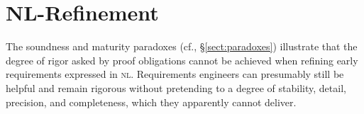 \documentclass[10pt, conference, compsocconf]{IEEEtran}
\begin{document}
%



\section{NL-Refinement}\label{sect:nlref}
The soundness and maturity paradoxes (cf., \S\ref{sect:paradoxes}) illustrate that the degree of rigor asked by proof obligations cannot be achieved when refining early requirements expressed in \textsc{nl}. Requirements engineers can presumably still be helpful and remain rigorous without pretending to a degree of stability, detail, precision, and completeness, which they apparently cannot deliver. 
\end{document}
